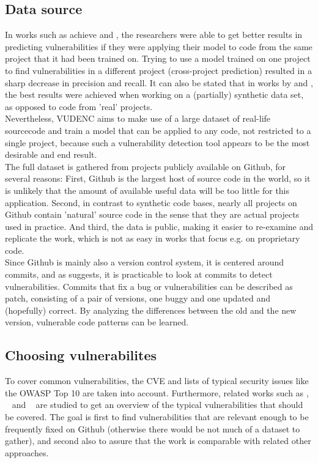\documentclass[
a4paper,
pagesize,
pdftex,
12pt,
twoside, %
BCOR=5mm, %
ngerman,
fleqn,
final,
]{scrartcl}
\begin{document}
	\subsection{Data source}
	In works such as \cite{Dam.2017} achieve and \cite{Pang.2015}, the researchers were able to get better results in predicting vulnerabilities if they were applying their model to code from the same project that it had been trained on. Trying to use a model trained on one project to find vulnerabilities in a different project (cross-project prediction) resulted in a sharp decrease in precision and recall. It can also be stated that in works by \cite{Russell.2018} and \cite{Li.2018}, the best results were achieved when working on a (partially) synthetic data set, as opposed to code from 'real' projects.\\
	Nevertheless, VUDENC aims to make use of a large dataset of real-life sourcecode and train a model that can be applied to any code, not restricted to a single project, because such a vulnerability detection tool appears to be the most desirable and end result.\\
	The full dataset is gathered from projects publicly available on Github, for several reasons: First, Github is the largest host of source code in the world, so it is unlikely that the amount of available useful data will be too little for this application. Second, in contrast to synthetic code bases, nearly all projects on Github contain 'natural' source code in the sense that they are actual projects used in practice. And third, the data is public, making it easier to re-examine and replicate the work, which is not as easy in works that focus e.g. on proprietary code.\\
	Since Github is mainly also a version control system, it is centered around commits, and as \cite{Zhou.2017} suggests, it is practicable to look at commits to detect vulnerabilities. Commits that fix a bug or vulnerabilities can be described as patch, consisting of a pair of versions, one buggy and one updated and (hopefully) correct.  By analyzing the differences between the old and the new version, vulnerable code patterns can be learned. \\
	
	\subsection{Choosing vulnerabilites}
	To cover common vulnerabilities, the CVE \cite{CVE} and lists of typical security issues like the OWASP Top 10 \cite{OWASPFoundation.} are taken into account. Furthermore, related works such as \cite{Zhou.2017}, ~\cite{Medeiros.2014} and ~\cite{Yamaguchi.2012} are studied to get an overview of the typical vulnerabilities that should be covered. The goal is first to find vulnerabilities that are relevant enough to be frequently fixed on Github (otherwise there would be not much of a dataset to gather), and second also to assure that the work is comparable with related other approaches. 
	
\end{document}
